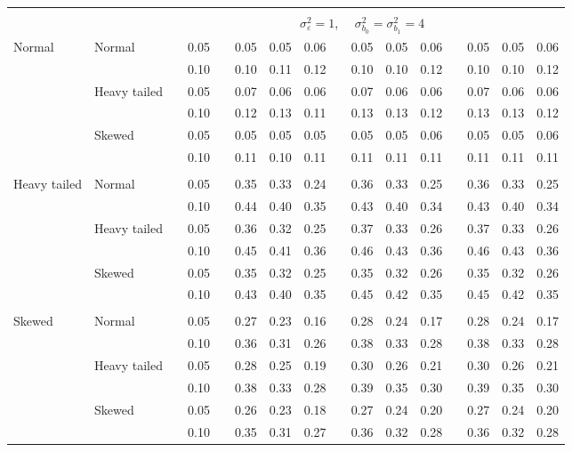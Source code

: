 \documentclass{article} %
\begin{document}
\begin{table}[ht]
\begin{scriptsize}
\begin{center}
\begin{tabular}{ll p{.1cm} c p{.1cm} rrr p{.1cm} rrr p{.1cm} rrr}
&&&&&&&&&&&&&&&\\
& && && \multicolumn{9}{c}{$\sigma_{\varepsilon}^2 = 1$, \ \ $\sigma_{b_0}^2 = \sigma_{b_1}^2 = 4$} \\ \cline{6-16}
\rowcolor{gray!20}Normal       & Normal       && 0.05 &&   0.05 & 0.05 & 0.06 && 0.05 & 0.05 & 0.06 && 0.05 & 0.05 & 0.06 \\ 
\rowcolor{gray!20}             &              && 0.10 &&   0.10 & 0.11 & 0.12 && 0.10 & 0.10 & 0.12 && 0.10 & 0.10 & 0.12 \\ 
\rowcolor{gray!20}             & Heavy tailed && 0.05 &&   0.07 & 0.06 & 0.06 && 0.07 & 0.06 & 0.06 && 0.07 & 0.06 & 0.06 \\ 
\rowcolor{gray!20}             &              && 0.10 &&   0.12 & 0.13 & 0.11 && 0.13 & 0.13 & 0.12 && 0.13 & 0.13 & 0.12 \\ 
\rowcolor{gray!20}             & Skewed       && 0.05 &&   0.05 & 0.05 & 0.05 && 0.05 & 0.05 & 0.06 && 0.05 & 0.05 & 0.06 \\ 
\rowcolor{gray!20}             &              && 0.10 &&   0.11 & 0.10 & 0.11 && 0.11 & 0.11 & 0.11 && 0.11 & 0.11 & 0.11 \\ 
             &&&&&&&&&&&&&&&\\
Heavy tailed & Normal       && 0.05 &&   0.35 & 0.33 & 0.24 && 0.36 & 0.33 & 0.25 && 0.36 & 0.33 & 0.25 \\ 
             &              && 0.10 &&   0.44 & 0.40 & 0.35 && 0.43 & 0.40 & 0.34 && 0.43 & 0.40 & 0.34 \\ 
             & Heavy tailed && 0.05 &&   0.36 & 0.32 & 0.25 && 0.37 & 0.33 & 0.26 && 0.37 & 0.33 & 0.26 \\ 
             &              && 0.10 &&   0.45 & 0.41 & 0.36 && 0.46 & 0.43 & 0.36 && 0.46 & 0.43 & 0.36 \\ 
             & Skewed       && 0.05 &&   0.35 & 0.32 & 0.25 && 0.35 & 0.32 & 0.26 && 0.35 & 0.32 & 0.26 \\ 
             &              && 0.10 &&   0.43 & 0.40 & 0.35 && 0.45 & 0.42 & 0.35 && 0.45 & 0.42 & 0.35 \\ 
             &&&&&&&&&&&&&&&\\
Skewed       & Normal       && 0.05 &&   0.27 & 0.23 & 0.16 && 0.28 & 0.24 & 0.17 && 0.28 & 0.24 & 0.17 \\ 
             &              && 0.10 &&   0.36 & 0.31 & 0.26 && 0.38 & 0.33 & 0.28 && 0.38 & 0.33 & 0.28 \\ 
             & Heavy tailed && 0.05 &&   0.28 & 0.25 & 0.19 && 0.30 & 0.26 & 0.21 && 0.30 & 0.26 & 0.21 \\ 
             &              && 0.10 &&   0.38 & 0.33 & 0.28 && 0.39 & 0.35 & 0.30 && 0.39 & 0.35 & 0.30 \\ 
             & Skewed       && 0.05 &&   0.26 & 0.23 & 0.18 && 0.27 & 0.24 & 0.20 && 0.27 & 0.24 & 0.20 \\ 
             &              && 0.10 &&   0.35 & 0.31 & 0.27 && 0.36 & 0.32 & 0.28 && 0.36 & 0.32 & 0.28 \\ 


\end{tabular}
\end{center}
\end{scriptsize}
\end{table}
\end{document}
